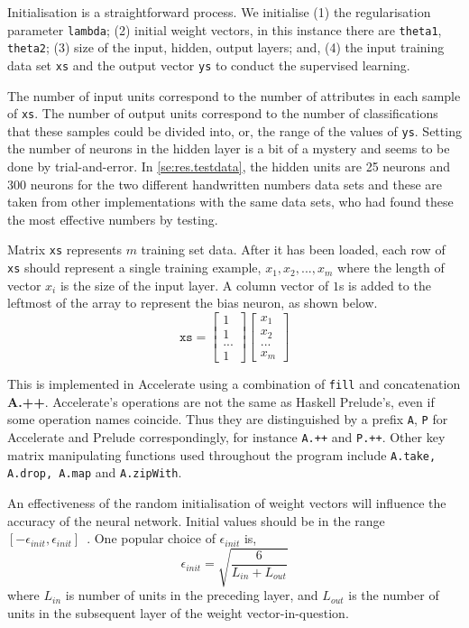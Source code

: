 Initialisation is a straightforward process. We initialise (1) the regularisation parameter \texttt{lambda}; (2) initial weight vectors, in this instance there are \texttt{theta1}, \texttt{theta2}; (3) size of the input, hidden, output layers; and, (4) the input training data set \texttt{xs} and the output vector \texttt{ys} to conduct the supervised learning. 

The number of input units correspond to the number of attributes in each sample of \texttt{xs}. The number of output units correspond to the number of classifications that these samples could be divided into, or, the range of the values of \texttt{ys}. Setting the number of neurons in the hidden layer is a bit of a mystery and seems to be done by trial-and-error. In \ref{se:res.testdata}, the hidden units are 25 neurons and 300 neurons for the two different handwritten numbers data sets and these are taken from other implementations with the same data sets, who had found these the most effective numbers by testing.

Matrix \texttt{xs} represents $m$ training set data. After it has been loaded, each row of \texttt{xs} should represent a single training example, $x_1, x_2, ..., x_m$ where the length of vector $x_i$ is the size of the input layer. A column vector of $1$s is added to the leftmost of the array to represent the bias neuron, as shown below.
\[
 \texttt{xs} =
    \begin{bmatrix}
      1 \\
      1 \\
      ... \\ 
      1
    \end{bmatrix}
    \begin{bmatrix}
       x_1 \\
       x_2 \\
       ... \\
       x_m
    \end{bmatrix}
\]

This is implemented in Accelerate using a combination of \texttt{fill} and concatenation \textbf{A.++}. Accelerate's operations are not the same as Haskell Prelude's, even if some operation names coincide. Thus they are distinguished by a prefix \texttt{A}, \texttt{P} for Accelerate and Prelude correspondingly, for instance \texttt{A.++} and \texttt{P.++}. Other key matrix manipulating functions used throughout the program include \texttt{A.take, A.drop, A.map} and \texttt{A.zipWith}.

An effectiveness of the random initialisation of weight vectors will influence the accuracy of the neural network. Initial values should be in the range $[-\epsilon_{init}, \epsilon_{init}]$~\cite{Ng12}. One popular choice of $\epsilon_{init}$ is,
\[ \epsilon_{init} = \sqrt{\frac{6}{L_{in} + L_{out}}} \]
where $L_{in}$ is number of units in the preceding layer, and $L_{out}$ is the number of units in the subsequent layer of the weight vector-in-question. 

